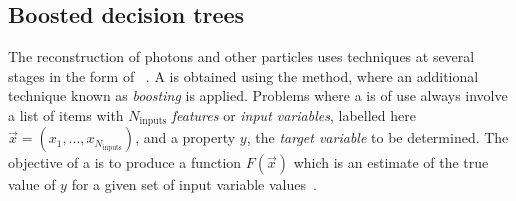 \begin{table}[htbp]
\begin{small}
\begin{center}
\end{center} 
\end{small}
\caption[Photon preselection efficiency (using all requirements aside from the electron veto) measured using \Zee
events in data and simulation with a \TagAndProbe technique\quad\cite{CMS-PAS-HIG-16-020}.]{Photon preselection efficiency (using all requirements aside from the electron veto) measured using \Zee
events in data and simulation with a \TagAndProbe technique~\cite{CMS-PAS-HIG-16-020}.}
\label{tab:reco:preslection_eff}
\end{table}


\subsection{Boosted decision trees}
\label{reco:sec:bdt}

The reconstruction of photons and other particles uses \MVA techniques at several stages in the form of \BDT\s~\cite{friedman2009}. A \BDT is obtained using the \DT method, where an additional technique known as \emph{boosting} is applied. Problems where a \BDT is of use always involve a list of items with $N_{\textrm{inputs}}$ \emph{features} or \emph{input variables}, labelled here $\vec{x} =(x_1, ... ,x_{N_{\textrm{inputs}}})$, and a property $y$, the \emph{target variable} to be determined. The objective of a \BDT is to produce a function $F(\vec{x})$ which is an estimate of the true value of $y$ for a given set of input variable values~\cite{friedman2001}. 

